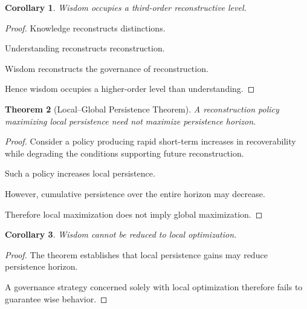 \documentclass[12pt,oneside]{article}
\newtheorem{theorem}{Theorem}[section] \newtheorem{lemma}[theorem]{Lemma} \newtheorem{proposition}[theorem]{Proposition} \newtheorem{corollary}[theorem]{Corollary}
\theoremstyle{definition}
\begin{document}
\begin{corollary}

Wisdom occupies a third-order reconstructive level.

\end{corollary}

\begin{proof}

Knowledge reconstructs distinctions.

Understanding reconstructs reconstruction.

Wisdom reconstructs the governance of reconstruction.

Hence wisdom occupies a higher-order level than understanding.

\end{proof}

\begin{theorem}[Local–Global Persistence Theorem]

A reconstruction policy maximizing local persistence need not maximize persistence horizon.

\end{theorem}

\begin{proof}

Consider a policy producing rapid short-term increases in recoverability while degrading the conditions supporting future reconstruction.

Such a policy increases local persistence.

However, cumulative persistence over the entire horizon may decrease.

Therefore local maximization does not imply global maximization.

\end{proof}

\begin{corollary}

Wisdom cannot be reduced to local optimization.

\end{corollary}

\begin{proof}

The theorem establishes that local persistence gains may reduce persistence horizon.

A governance strategy concerned solely with local optimization therefore fails to guarantee wise behavior.

\end{proof}
\end{document}
